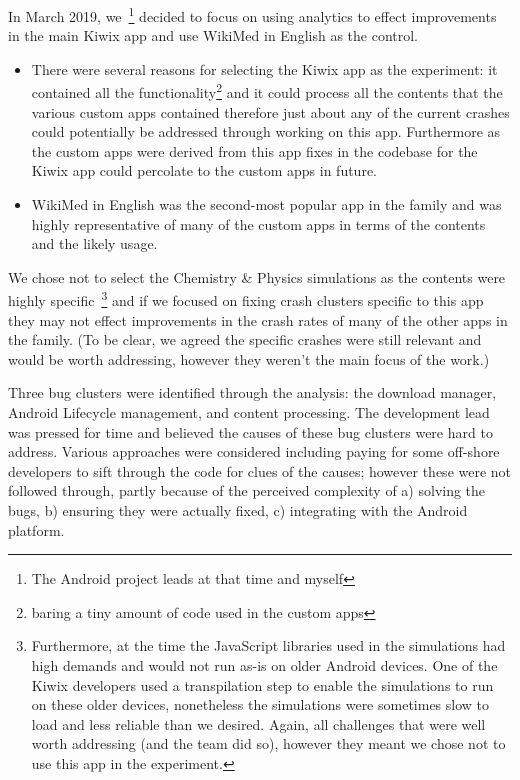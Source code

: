 In March 2019, we~\footnote{The Android project leads at that time and myself} decided to focus on using analytics to effect improvements in the main Kiwix app and use WikiMed in English as the control. 
\begin{itemize}
    \item There were several reasons for selecting the Kiwix app as the experiment: it contained all the functionality\footnote{baring a tiny amount of code used in the custom apps} and it could process all the contents that the various custom apps contained therefore just about any of the current crashes could potentially be addressed through working on this app. Furthermore as the custom apps were derived from this app fixes in the codebase for the Kiwix app could percolate to the custom apps in future. 
    \item WikiMed in English was the second-most popular app in the family and was highly representative of many of the custom apps in terms of the contents and the likely usage.
\end{itemize}

We chose not to select the Chemistry \& Physics simulations as the contents were highly specific~\footnote{Furthermore, at the time the JavaScript libraries used in the simulations had high demands and would not run as-is on older Android devices. One of the Kiwix developers used a transpilation step to enable the simulations to run on these older devices, nonetheless the simulations were sometimes slow to load and less reliable than we desired. Again, all challenges that were well worth addressing (and the team did so), however they meant we chose not to use this app in the experiment.} 
and if we focused on fixing crash clusters specific to this app they may not effect improvements in the crash rates of many of the other apps in the family. (To be clear, we agreed the specific crashes were still relevant and would be worth addressing, however they weren't the main focus of the work.) 

Three bug clusters were identified through the analysis: the download manager, Android Lifecycle management, and content processing. The development lead was pressed for time and believed the causes of these bug clusters were hard to address. Various approaches were considered including paying for some off-shore developers to sift through the code for clues of the causes; however these were not followed through, partly because of the perceived complexity of a) solving the bugs, b) ensuring they were actually fixed, c) integrating with the Android platform. 

